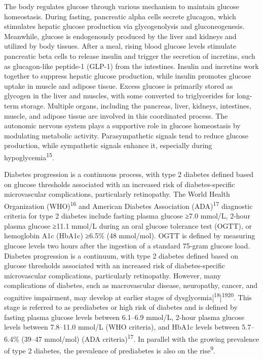 \documentclass[
  a4paper,
  headsepline=true,
  open=any]{scrbook}
\begin{document}
The body regulates glucose through various mechanism to maintain glucose
homeostasis. During fasting, pancreatic alpha cells secrete glucagon,
which stimulates hepatic glucose production via glycogenolysis and
gluconeogenesis. Meanwhile, glucose is endogenously produced by the
liver and kidneys and utilized by body tissues. After a meal, rising
blood glucose levels stimulate pancreatic beta cells to release insulin
and trigger the secretion of incretins, such as glucagon-like peptide-1
(GLP-1) from the intestines. Insulin and incretins work together to
suppress hepatic glucose production, while insulin promotes glucose
uptake in muscle and adipose tissue. Excess glucose is primarily stored
as glycogen in the liver and muscles, with some converted to
triglycerides for long-term storage. Multiple organs, including the
pancreas, liver, kidneys, intestines, muscle, and adipose tissue are
involved in this coordinated process. The autonomic nervous system plays
a supportive role in glucose homeostasis by modulating metabolic
activity. Parasympathetic signals tend to reduce glucose production,
while sympathetic signals enhance it, especially during
hypoglycemia\textsuperscript{15}.

Diabetes progression is a continuous process, with type 2 diabetes
defined based on glucose thresholds associated with an increased risk of
diabetes-specific microvascular complications, particularly retinopathy.
The World Health Organization (WHO)\textsuperscript{16} and American
Diabetes Association (ADA)\textsuperscript{17} diagnostic criteria for
type 2 diabetes include fasting plasma glucose ≥7.0 mmol/L, 2-hour
plasma glucose ≥11.1 mmol/L during an oral glucose tolerance test
(OGTT), or hemoglobin A1c (HbA1c) ≥6.5\% (48 mmol/mol). OGTT is defined
by measuring glucose levels two hours after the ingestion of a standard
75-gram glucose load. Diabetes progression is a continuum, with type 2
diabetes defined based on glucose thresholds associated with an
increased risk of diabetes-specific microvascular complications,
particularly retinopathy. However, many complications of diabetes, such
as macrovascular disease, neuropathy, cancer, and cognitive impairment,
may develop at earlier stages of
dysglycemia{[}\textsuperscript{18}{]}\textsuperscript{19}\textsuperscript{20}.
This stage is referred to as prediabetes or high risk of diabetes and is
defined by fasting plasma glucose levels between 6.1--6.9 mmol/L, 2-hour
plasma glucose levels between 7.8--11.0 mmol/L (WHO criteria), and HbA1c
levels between 5.7--6.4\% (39--47 mmol/mol) (ADA
criteria)\textsuperscript{17}. In parallel with the growing prevalence
of type 2 diabetes, the prevalence of prediabetes is also on the
rise\textsuperscript{9}.
\end{document}
